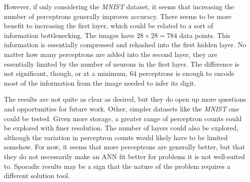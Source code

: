 \documentclass{article}
\begin{document}
However, if only considering the \emph{MNIST} dataset, it seems that increasing the number of perceptrons generally improves accuracy. There seems to be more benefit to increasing the first layer, which could be related to a sort of information bottlenecking. The images have $28 \times 28 = 784$ data points. This information is essentially compressed and rehashed into the first hidden layer. No matter how many perceptrons are added into the second layer, they are essentially limited by the number of neurons in the first layer. The difference is not significant, though, or at a minimum, 64 perceptrons is enough to encode most of the information from the image needed to infer its digit.

The results are not quite as clear as desired, but they do open up more questions and opportunities for future work. Other, simpler datasets like the \emph{MNIST} one could be tested. Given more storage, a greater range of perceptron counts could be explored with finer resolution. The number of layers could also be explored, although the variation in perceptron counts would likely have to be limited somehow. For now, it seems that more perceptrons are generally better, but that they do not necessarily make an ANN fit better for problems it is not well-suited to. Sporadic results may be a sign that the nature of the problem requires a different solution tool.



\end{document}

